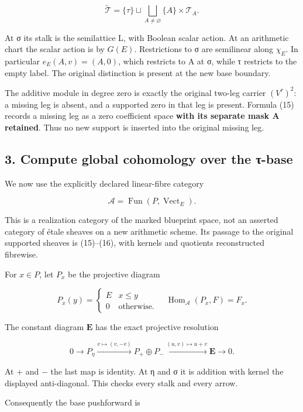 \documentclass[
]{article}
\begin{document}
\[
\widetilde{\mathcal T}
=\{\tau\}\sqcup\bigsqcup_{A\ne\varnothing}\{A\}\times\mathcal T_A.
\tag{16}
\]

At σ its stalk is the semilattice L, with Boolean scalar action. At an
arithmetic chart the scalar action is by \(G(E)\). Restrictions to σ are
semilinear along \(\chi_E\). In particular \(e_E(A,v)=(A,0)\), which
restricts to A at σ, while τ restricts to the empty label. The original
distinction is present at the new base boundary.

The additive module in degree zero is exactly the original two-leg
carrier \((V^\tau)^2\): a missing leg is absent, and a supported zero in
that leg is present. Formula (15) records a missing leg as a zero
coefficient space \textbf{with its separate mask A retained}. Thus no
new support is inserted into the original missing leg.

\subsection{3. Compute global cohomology over the
τ-base}\label{compute-global-cohomology-over-the-ux3c4-base}

We now use the explicitly declared linear-fibre category

\[
\mathcal A=\operatorname{Fun}(P,\operatorname{Vect}_E).
\]

This is a realization category of the marked blueprint space, not an
asserted category of étale sheaves on a new arithmetic scheme. Its
passage to the original supported sheaves is (15)--(16), with kernels
and quotients reconstructed fibrewise.

For \(x\in P\), let \(P_x\) be the projective diagram

\[
P_x(y)=\begin{cases}E&x\le y\\0&\text{otherwise}.\end{cases}
\quad
\operatorname{Hom}_{\mathcal A}(P_x,F)=F_x.
\tag{17}
\]

The constant diagram \(\mathbf E\) has the exact projective resolution

\[
0\longrightarrow P_\eta
\xrightarrow{v\mapsto(v,-v)}P_+\oplus P_-
\xrightarrow{(u,v)\mapsto u+v}\mathbf E\longrightarrow0.
\tag{18}
\]

At + and − the last map is identity. At η and σ it is addition with
kernel the displayed anti-diagonal. This checks every stalk and every
arrow.

Consequently the base pushforward is
\end{document}
